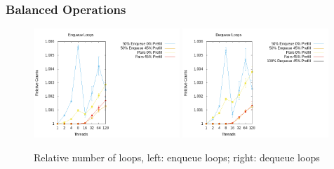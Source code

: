 \documentclass{article}      %
\begin{document}

\subsubsection{Balanced Operations}

\begin{figure}[H]
	\centering
	\includegraphics[width=0.49\textwidth]{Pictures/diss_enq_loops_red.png}
	\includegraphics[width=0.49\textwidth]{Pictures/diss_deq_loops_red.png}
	\caption{Relative number of loops, left: enqueue loops; right: dequeue loops}
	\label{fig:diss_red_loops}
\end{figure}
\end{document}
